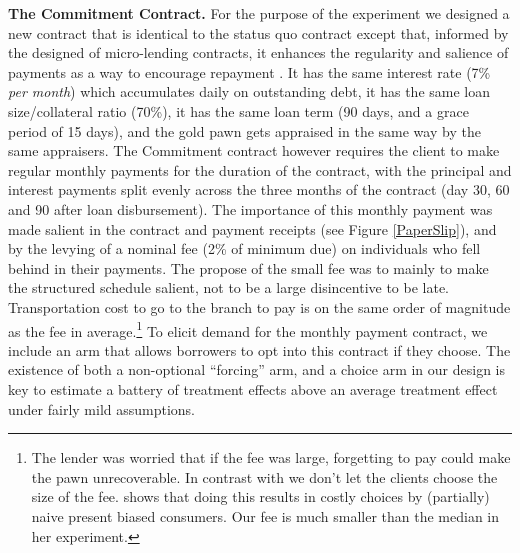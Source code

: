 \documentclass[oneside,11pt]{article}
\begin{document}
\noindent \textbf{The Commitment Contract.} For the purpose of the experiment we designed a new contract that is identical to the status quo contract except that, informed by the designed of micro-lending contracts, it enhances the regularity and salience of payments as a way to encourage repayment \citep{morduch1999microfinance, bauer2012behavioral}.  It has the same interest rate (7\% \textit{per month}) which accumulates daily on outstanding debt, it has the same loan size/collateral ratio (70\%), it has the same loan term (90 days, and a grace period of 15 days), and the gold pawn gets appraised in the same way by the same appraisers. The Commitment contract however requires the client to make regular monthly payments for the duration of the contract, with the principal and interest payments split evenly across the three months of the contract (day 30, 60 and 90 after loan disbursement). The importance of this monthly payment was made salient in the contract and payment receipts (see Figure \ref{PaperSlip}), and by the levying of a nominal fee (2\% of minimum due) on individuals who fell behind in their payments. The propose of the small fee was to mainly to make the structured schedule salient, not to be a large disincentive to be late. Transportation cost to go to the branch to pay is on the same order of magnitude as the fee in average.\footnote{The lender was worried that if the fee was large, forgetting to pay could make the pawn unrecoverable. In contrast with \cite{John} we don't let the clients choose the size of the fee. \cite{John} shows that doing this results in costly choices by (partially) naive present biased consumers. Our fee is much smaller than the median in her experiment. %
} To elicit demand for the monthly payment contract, we include an arm that allows borrowers to opt into this contract if they choose. The existence of both a non-optional ``forcing'' arm, and a choice arm in our design is key to estimate a battery of treatment effects above an average treatment effect under fairly mild assumptions.
\end{document}
